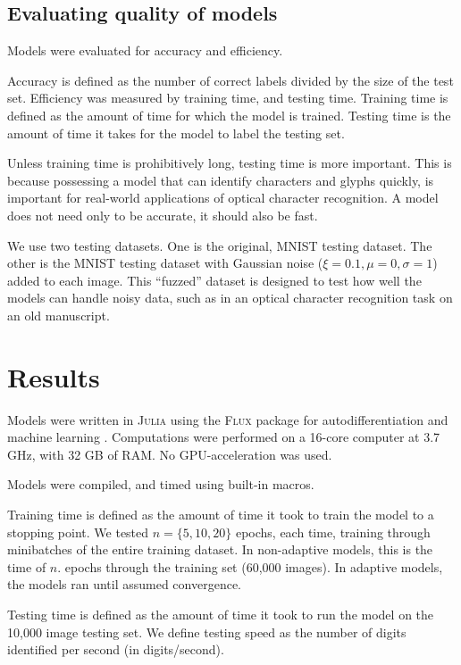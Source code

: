 \documentclass{article}
\begin{document}
\subsection{Evaluating quality of models}

Models were evaluated for accuracy and efficiency.

Accuracy is defined as the number of correct labels divided by the size of the test set.
Efficiency was measured by training time, and testing time.
Training time is defined as the amount of time for which the model is trained.
Testing time is the amount of time it takes for the model to label the testing set.

Unless training time is prohibitively long, testing time is more important.
This is because possessing a model that can identify characters and glyphs quickly,
is important for real-world applications of optical character recognition.
A model does not need only to be accurate, it should also be fast.

We use two testing datasets.
One is the original, MNIST testing dataset.
The other is the MNIST testing dataset with Gaussian noise ($\xi = 0.1, \mu = 0, \sigma = 1$) added to each image.
This ``fuzzed'' dataset is designed to test how well the models can handle noisy data,
such as in an optical character recognition task on an old manuscript.

\section{Results}

Models were written in \textsc{Julia} \citep{bezansonJuliaFreshApproach2017a}
using the \textsc{Flux} package for autodifferentiation and machine learning \citep{innesFluxElegantMachine2018}.
Computations were performed on a 16-core computer at 3.7 GHz,
with 32 GB of RAM.
No GPU-acceleration was used.

Models were compiled, and timed using built-in macros.

Training time is defined as the amount of time it took to train the model to a stopping point.
We tested $n = \{ 5, 10, 20 \}$ epochs, each time, training through minibatches of the entire training dataset.
In non-adaptive models, this is the time of $n$. epochs through the training set (60,000 images).
In adaptive models, the models ran until assumed convergence.

Testing time is defined as the amount of time it took to run the model on the 10,000 image testing set.
We define testing speed as the number of digits identified per second (in digits/second).
\end{document}

